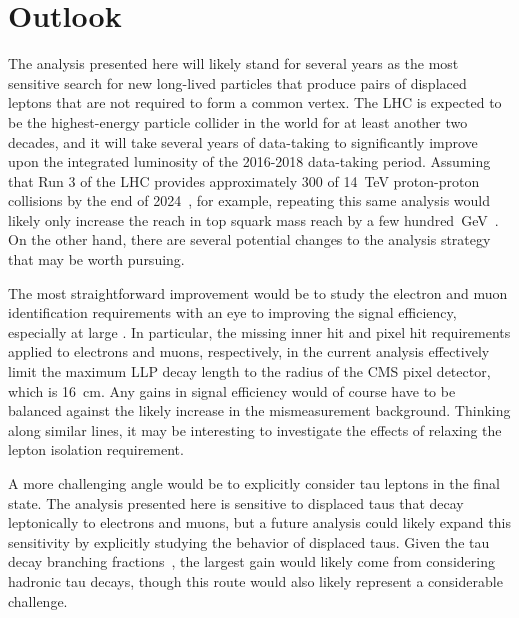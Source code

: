 \section{Outlook}
\label{outlook}
The analysis presented here will likely stand for several years as the most sensitive search for new long-lived particles that produce pairs of displaced leptons that are not required to form a common vertex. The LHC is expected to be the highest-energy particle collider in the world for at least another two decades, and it will take several years of data-taking to significantly improve upon the integrated luminosity of the 2016-2018 data-taking period. Assuming that Run 3 of the LHC provides approximately \SI{300}{\fbinv} of \SI{14}{\TeV} proton-proton collisions by the end of 2024~\cite{run3_constraints, lhc_schedule}, for example, repeating this same analysis would likely only increase the reach in top squark mass reach by a few hundred~\si{\GeV}~\cite{collider_reach}. On the other hand, there are several potential changes to the analysis strategy that may be worth pursuing.

The most straightforward improvement would be to study the electron and muon identification requirements with an eye to improving the signal efficiency, especially at large \ad. In particular, the missing inner hit and pixel hit requirements applied to electrons and muons, respectively, in the current analysis effectively limit the maximum LLP decay length to the radius of the CMS pixel detector, which is \SI{16}{\cm}. Any gains in signal efficiency would of course have to be balanced against the likely increase in the mismeasurement background. Thinking along similar lines, it may be interesting to investigate the effects of relaxing the lepton isolation requirement.

A more challenging angle would be to explicitly consider tau leptons in the final state. The analysis presented here is sensitive to displaced taus that decay leptonically to electrons and muons, but a future analysis could likely expand this sensitivity by explicitly studying the \ad behavior of displaced taus. Given the tau decay branching fractions~\cite{pdg_2020}, the largest gain would likely come from considering hadronic tau decays, though this route would also likely represent a considerable challenge.

